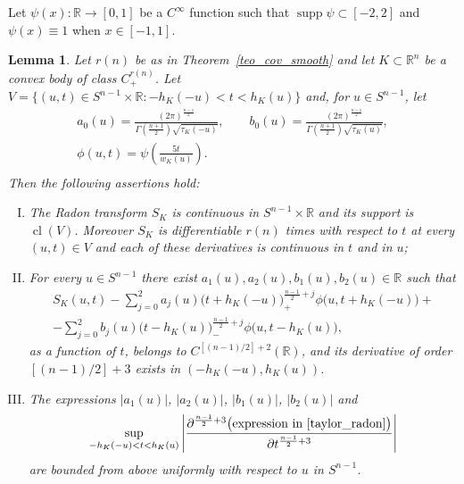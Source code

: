 \documentclass[a4paper]{amsart}
\newtheorem{lemma}[theorem]{Lemma}
\theoremstyle{definition}
\numberwithin{equation}{section}
\begin{document}
Let $\psi(x):{\mathbb{R}}\to[0,1]$ be a $C^\infty$ function such that ${{\operatorname{supp}}} \psi\subset[-2,2]$ and  $\psi(x)\equiv1$ when $x\in[-1,1]$.
\begin{lemma}\label{lem_kobayashi_cm}
Let ${{r(n)}}$ be as in Theorem~\ref{teo_cov_smooth} and let $K\subset{\mathbb{R}}^n$ be a convex body of class $C^{{r(n)}}_+$. Let $V=\{(u,t)\in{S^{n-1}}\times{\mathbb{R}}: -h_K(-u)<t<h_K(u)\}$ and, for $u\in{S^{n-1}}$, let
\begin{gather*}
a_0(u)=\frac{(2\pi)^{\frac{n-1}2}}{\Gamma(\frac{n+1}2)\sqrt{{\tau}_K(-u)}},\quad\quad
b_0(u)=\frac{(2\pi)^{\frac{n-1}2}}{\Gamma(\frac{n+1}2)\sqrt{{\tau}_K(u)}},\\
\phi(u,t)=\psi\left(\frac{5t}{{{{w}}}_K(u)}\right).\\
\end{gather*}
Then the following assertions hold:
\begin{enumerate}[(I)]
\item\label{ass:lem_kobayashi_cm_I} The Radon transform $S_K$ is continuous in ${S^{n-1}}\times{\mathbb{R}}$ and its support is ${{\operatorname{cl}}}(V)$. Moreover $S_K$ is differentiable ${{r(n)}}$ times with respect to $t$ at every $(u,t)\in V$ and each of these derivatives is continuous in  $t$ and in $u$;
\item\label{ass:lem_kobayashi_cm_II} For every $u\in{S^{n-1}}$ there exist $a_1(u), a_2(u), b_1(u), b_2(u)\in{\mathbb{R}}$ such that
\begin{multline}\label{taylor_radon}
 S_K(u,t)-\sum_{j=0}^2a_j(u)\Big(t+h_K(-u)\Big)^{\frac{n-1}2+j}_+
\phi\big(u,t+h_K(-u)\big)+\\-\sum_{j=0}^2b_j(u)\Big(t-h_K(u)\Big)^{\frac{n-1}2+j}_-
\phi\big(u,t-h_K(u)\big),
\end{multline}
as a function of $t$, belongs to $C^{\left[(n-1)/2\right]+2}({\mathbb{R}})$, and its derivative of order $\left[(n-1)/2\right]+3$ exists in $(-h_K(-u), h_K(u))$.
\item\label{ass:lem_kobayashi_cm_III} The expressions  $|a_1(u)|$, $|a_2(u)|$, $|b_1(u)|$, $|b_2(u)|$ and 
\[
 \sup_{-h_K(-u)< t< h_K(u)}\left|\frac{{{\partial}}^{\frac{n-1}{2}+3}\big(\text{expression in \eqref{taylor_radon}}\big)}{{{\partial}} t^{\frac{n-1}{2}+3}}\right|
\]
are  bounded from above uniformly with respect to $u$ in ${S^{n-1}}$.
\end{enumerate}
\end{lemma}
\end{document}
